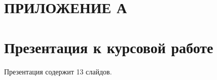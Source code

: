 \renewcommand{\contentsname}{\normalsize\bfseries\centering СОДЕРЖАНИЕ}
    \tableofcontents
    \normalsize











\section*{\centering ПРИЛОЖЕНИЕ А}

\section*{Презентация к курсовой работе}
Презентация содержит 13 слайдов.

